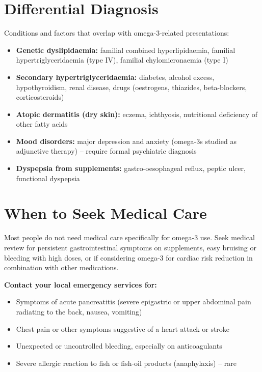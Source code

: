 \section*{Differential Diagnosis}
Conditions and factors that overlap with omega-3-related presentations:
\begin{itemize}
    \item \textbf{Genetic dyslipidaemia:} familial combined hyperlipidaemia, familial hypertriglyceridaemia (type IV), familial chylomicronaemia (type I)
    \item \textbf{Secondary hypertriglyceridaemia:} diabetes, alcohol excess, hypothyroidism, renal disease, drugs (oestrogens, thiazides, beta-blockers, corticosteroids)
    \item \textbf{Atopic dermatitis (dry skin):} eczema, ichthyosis, nutritional deficiency of other fatty acids
    \item \textbf{Mood disorders:} major depression and anxiety (omega-3s studied as adjunctive therapy) -- require formal psychiatric diagnosis
    \item \textbf{Dyspepsia from supplements:} gastro-oesophageal reflux, peptic ulcer, functional dyspepsia
\end{itemize}

\section*{When to Seek Medical Care}
Most people do not need medical care specifically for omega-3 use. Seek medical review for persistent gastrointestinal symptoms on supplements, easy bruising or bleeding with high doses, or if considering omega-3 for cardiac risk reduction in combination with other medications.

\textbf{Contact your local emergency services for:}
\begin{itemize}
    \item Symptoms of acute pancreatitis (severe epigastric or upper abdominal pain radiating to the back, nausea, vomiting)
    \item Chest pain or other symptoms suggestive of a heart attack or stroke
    \item Unexpected or uncontrolled bleeding, especially on anticoagulants
    \item Severe allergic reaction to fish or fish-oil products (anaphylaxis) -- rare
\end{itemize}

